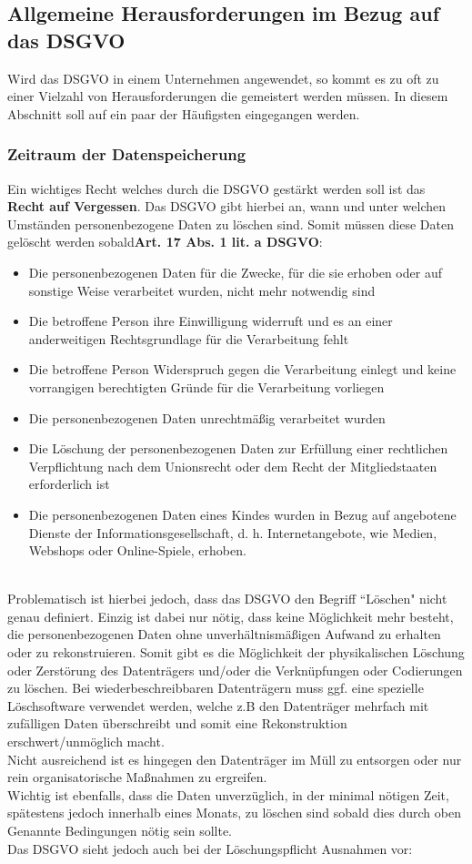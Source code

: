 \documentclass[a4paper, 12pt]{article}
\begin{document}
\subsection{Allgemeine Herausforderungen im Bezug auf das DSGVO}
Wird das DSGVO in einem Unternehmen angewendet, so kommt es zu oft zu einer Vielzahl von Herausforderungen die gemeistert werden müssen. In diesem Abschnitt soll auf ein paar der Häufigsten eingegangen werden.

\subsubsection{Zeitraum der Datenspeicherung}
Ein wichtiges Recht welches durch die DSGVO gestärkt werden soll ist das \textbf{Recht auf Vergessen}. Das DSGVO gibt hierbei an, wann und unter welchen Umständen personenbezogene Daten zu löschen sind. Somit müssen diese Daten gelöscht werden sobald\textbf{Art. 17 Abs. 1 lit. a DSGVO}:
\begin{itemize}
	\item Die personenbezogenen Daten für die Zwecke, für die sie erhoben oder auf sonstige Weise verarbeitet wurden, nicht mehr notwendig sind
	\item Die betroffene Person ihre Einwilligung widerruft und es an einer anderweitigen Rechtsgrundlage für die Verarbeitung fehlt
	\item Die betroffene Person Widerspruch gegen die Verarbeitung einlegt und keine vorrangigen berechtigten Gründe für die Verarbeitung vorliegen
	\item Die personenbezogenen Daten unrechtmäßig verarbeitet wurden
	\item Die Löschung der personenbezogenen Daten zur Erfüllung einer rechtlichen Verpflichtung nach dem Unionsrecht oder dem Recht der Mitgliedstaaten erforderlich ist
	\item Die personenbezogenen Daten eines Kindes wurden in Bezug auf angebotene Dienste der Informationsgesellschaft, d. h. Internetangebote, wie Medien, Webshops oder Online-Spiele, erhoben.
\end{itemize}\cite{datenschutz_internet}\\
Problematisch ist hierbei jedoch, dass das DSGVO den Begriff ``Löschen" nicht genau definiert. Einzig ist dabei nur nötig, dass keine Möglichkeit mehr besteht, die personenbezogenen Daten ohne unverhältnismäßigen Aufwand zu erhalten oder zu rekonstruieren. Somit gibt es die Möglichkeit der physikalischen Löschung oder Zerstörung des Datenträgers und/oder die Verknüpfungen oder Codierungen zu löschen. Bei wiederbeschreibbaren Datenträgern muss ggf. eine spezielle Löschsoftware verwendet werden, welche z.B den Datenträger mehrfach mit zufälligen Daten überschreibt und somit eine Rekonstruktion erschwert/unmöglich macht.\\Nicht ausreichend ist es hingegen den Datenträger im Müll zu entsorgen oder nur rein organisatorische Maßnahmen zu ergreifen.\\Wichtig ist ebenfalls, dass die Daten unverzüglich, in der minimal nötigen Zeit, spätestens jedoch innerhalb eines Monats, zu löschen sind sobald dies durch oben Genannte Bedingungen nötig sein sollte.\\Das DSGVO sieht jedoch auch bei der Löschungspflicht Ausnahmen vor:
\end{document}
